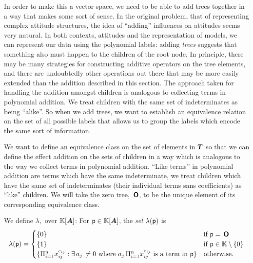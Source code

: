 \begin{definition}\label{equivclass}
  In order to make this a vector space, we need to be able to add
  trees together in a way that makes some sort of sense.  In the
  original problem, that of representing complex attitude structures,
  the idea of ``adding'' influences on attitudes seems very natural.
  In both contexts, attitudes and the representation of models, we can
  represent our data using the polynomial labels: adding \emph{trees}
  suggests that something also must happen to the children of the root
  node. In principle, there may be many strategies for constructing
  additive operators on the tree elements, and there are undoubtedly
  other operations out there that may be more easily extended than the
  addition described in this section. The approach taken for handling
  the addition amongst children is analogous to collecting terms in
  polynomial addition. We treat children with the same set of
  indeterminates as being ``alike''. So when we add trees, we want to
  establish an equivalence relation on the set of all possible labels
  that allows us to group the labels which encode the same sort of
  information.

  We want to define an equivalence class on the set of elements in
  $\DOM$ so that we can define the effect addition on the sets of
  children in a way which is analogous to the way we collect terms in
  polynomial addition.  ``Like terms'' in polynomial addition are
  terms which have the same indeterminate, we treat children which
  have the same set of indeterminates (their individual terms sans
  coefficients) as ``like'' children.  We will take the zero tree,
  $\zerotree$, to be the unique element of its corresponding
  equivalence class.  

  We define $\lambda,$ over $\PLY{A}$:
  For $\poly{p}\in\PLY{A}$, the \emph{set} $\lambda(\poly{p})$ is
  \begin{equation*}
    \lambda(\poly{p}) = \begin{cases}
      \{0\} & \text{if } \poly{p} = \zerotree \\
      \{1\} & \text{if }\poly{p}\in\FIELD\setminus\{0\} \\
      \{\polynomialfactor{x}{e}{n}: \exists\, a_j\, \neq 0
      \text{ where $a_j\,\polynomialfactor{x}{e}{n}$ is a term in }
      \poly{p}\}&\text{otherwise}. \\
    \end{cases}
  \end{equation*}


\end{definition}
